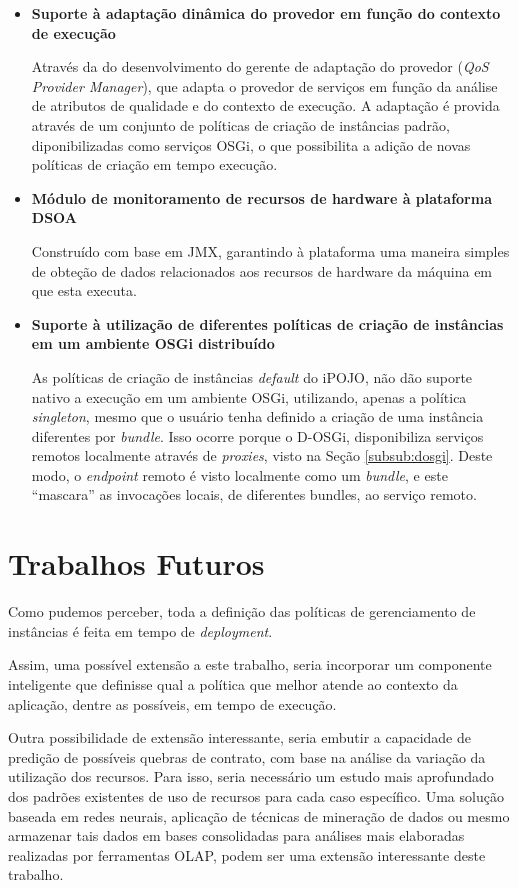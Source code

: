 \begin{itemize}

\item \textbf{Suporte à adaptação dinâmica do provedor em função do contexto de execução}

Através da do desenvolvimento do gerente de adaptação do provedor (\textit{QoS Provider Manager}), que adapta o provedor de serviços em função da análise de atributos de qualidade e do contexto de execução. A adaptação é provida através de um conjunto de políticas de criação de instâncias padrão, diponibilizadas como serviços OSGi, o que possibilita a adição de novas políticas de criação em tempo execução.

\item \textbf{Módulo de monitoramento de recursos de hardware à plataforma DSOA}

Construído com base em JMX, garantindo à plataforma uma maneira simples de obteção de dados relacionados aos recursos de hardware da máquina em que esta executa.

\item \textbf{Suporte à utilização de diferentes políticas de criação de instâncias em um ambiente OSGi distribuído}

As políticas de criação de instâncias \textit{default} do iPOJO, não dão suporte nativo a execução em um ambiente OSGi, utilizando, apenas a política \textit{singleton}, mesmo que o usuário tenha definido a criação de uma instância diferentes por \textit{bundle}. Isso ocorre porque o D-OSGi, disponibiliza serviços remotos localmente através de \textit{proxies}, visto na Seção \ref{subsub:dosgi}. Deste modo, o \textit{endpoint} remoto é visto localmente como um \textit{bundle}, e este ``mascara'' as invocações locais, de diferentes bundles, ao serviço remoto.

\end{itemize}

\section{Trabalhos Futuros}
Como pudemos perceber, toda a definição das políticas de gerenciamento de instâncias é feita em tempo de \textit{deployment}. 

Assim, uma possível extensão a este trabalho, seria incorporar um componente inteligente que definisse qual a política que melhor atende ao contexto da aplicação, dentre as possíveis, em tempo de execução.

Outra possibilidade de extensão interessante, seria embutir a capacidade de predição de possíveis quebras de contrato, com base na análise da variação da utilização dos recursos. Para isso, seria necessário um estudo mais aprofundado dos padrões existentes de uso de recursos para cada caso específico. Uma solução baseada em redes neurais, aplicação de técnicas de mineração de dados ou mesmo armazenar tais dados em bases consolidadas para análises mais elaboradas realizadas por ferramentas OLAP, podem ser uma extensão interessante deste trabalho.